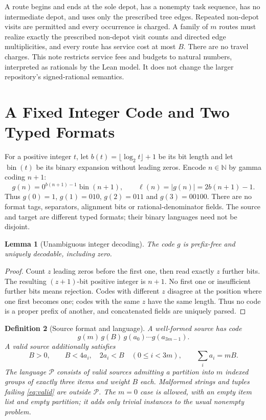 \documentclass[11pt]{article}
\newtheorem{definition}{Definition}[section]
\newtheorem{lemma}[definition]{Lemma}
\theoremstyle{remark}
\newcommand{\N}{\mathbb N}
\begin{document}
A route begins and ends at the sole depot, has a nonempty task sequence,
has no intermediate depot, and uses only the prescribed tree edges.
Repeated non-depot visits are permitted and every occurrence is charged.
A family of $m$ routes must realize exactly the prescribed non-depot visit
counts and directed edge multiplicities, and every route has service cost at
most $B$. There are no travel charges. This note restricts service fees and
budgets to natural numbers, interpreted as rationals by the Lean model.
It does not change the larger repository's signed-rational semantics.

\section{A Fixed Integer Code and Two Typed Formats}
\label{sec:code}

For a positive integer $t$, let $b(t)=\lfloor\log_2 t\rfloor+1$ be its bit
length and let $\operatorname{bin}(t)$ be its binary expansion without leading
zeros. Encode $n\in\N$ by gamma coding $n+1$:
\begin{equation}\label{eq:gamma}
 g(n)=0^{b(n+1)-1}\operatorname{bin}(n+1),\qquad
 \ell(n)=|g(n)|=2b(n+1)-1.
\end{equation}
Thus $g(0)=1$, $g(1)=010$, $g(2)=011$ and $g(3)=00100$.
There are no format tags, separators, alignment bits or rational-denominator
fields. The source and target are different typed formats; their binary
languages need not be disjoint.

\begin{lemma}[Unambiguous integer decoding]\label{lem:decode}
The code $g$ is prefix-free and uniquely decodable, including zero.
\end{lemma}
\begin{proof}
Count $z$ leading zeros before the first one, then read exactly $z$ further
bits. The resulting $(z+1)$-bit positive integer is $n+1$.
No first one or insufficient further bits means rejection. Codes with
different $z$ disagree at the position where one first becomes one; codes
with the same $z$ have the same length. Thus no code is a proper prefix of
another, and concatenated fields are uniquely parsed.
\end{proof}

\begin{definition}[Source format and language]\label{def:source}
A well-formed source has code
\begin{equation}\label{eq:source}
 g(m)\,g(B)\,g(a_0)\cdots g(a_{3m-1}).
\end{equation}
A valid source additionally satisfies
\begin{equation}\label{eq:valid}
 B>0,\qquad B<4a_i,\quad 2a_i<B\quad(0\le i<3m),\qquad
 \sum_i a_i=mB.
\end{equation}
The language $\mathcal P$ consists of valid sources admitting a partition
into $m$ indexed groups of exactly three items and weight $B$ each.
Malformed strings and tuples failing \eqref{eq:valid} are outside
$\mathcal P$. The $m=0$ case is allowed, with an empty item list and empty
partition; it adds only trivial instances to the usual nonempty problem.
\end{definition}
\end{document}
